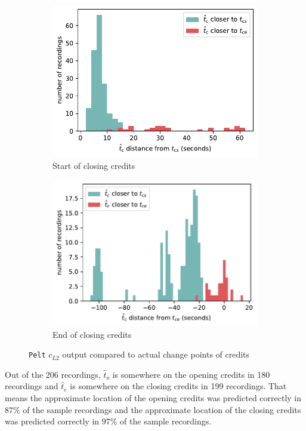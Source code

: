 \begin{figure}[H]
\begin{subfigure}[t]{.49\textwidth}
        \centering
        \includegraphics[width=\linewidth]{../plots/distances/pelt_l2_dist_end_first.pdf}
        \caption{Start of closing credits}
        \label{fig:t_diff_cs}
      \end{subfigure}
      \begin{subfigure}[t]{.49\textwidth}
        \centering
        \includegraphics[width=\linewidth]{../plots/distances/pelt_l2_dist_end_last.pdf}
        \caption{End of closing credits}
        \label{fig:t_diff_ce}
      \end{subfigure}
    \caption{\texttt{Pelt} $c_{L2}$ output compared to actual change points of credits}
    \label{fig:t_diff_credits}
\end{figure}

Out of the 206 recordings, $\hat{t}_o$ is somewhere on the opening credits in 180 recordings and $\hat{t}_e$ is somewhere on the closing credits in 199 recordings. 
That means the approximate location of the opening credits was predicted correctly in $87\%$ of the sample recordings and the approximate location of the closing credits was predicted correctly in $97\%$ of the sample recordings.

